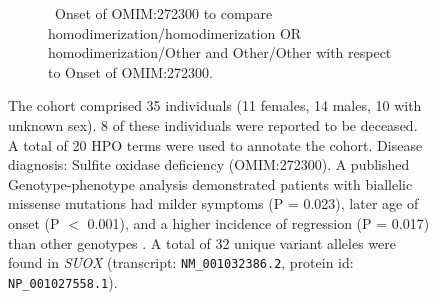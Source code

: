 \begin{figure}[htbp]
\vspace{0.2em}

\begin{subfigure}[b]{0.95\textwidth}
\captionsetup{justification=raggedright,singlelinecheck=false}
\caption{ Onset of OMIM:272300 to compare homodimerization/homodimerization OR homodimerization/Other and Other/Other with respect to Onset of OMIM:272300. }
\end{subfigure}

\vspace{0.2em}

\caption{ The cohort comprised 35 individuals (11 females, 14 males, 10 with unknown sex). 8 of these individuals were reported to be deceased. 
A total of 20 HPO terms were used to annotate the cohort. Disease diagnosis: Sulfite oxidase deficiency (OMIM:272300). 
A published Genotype-phenotype analysis demonstrated patients with biallelic missense mutations 
had milder symptoms (P = 0.023), later age of onset (P $<$ 0.001), and a higher incidence of regression (P = 0.017)
than other genotypes \cite{PMID_36303223}. A total of 32 unique variant alleles were found in \textit{SUOX} (transcript: \texttt{NM\_001032386.2}, protein id: \texttt{NP\_001027558.1}).}
\end{figure}
